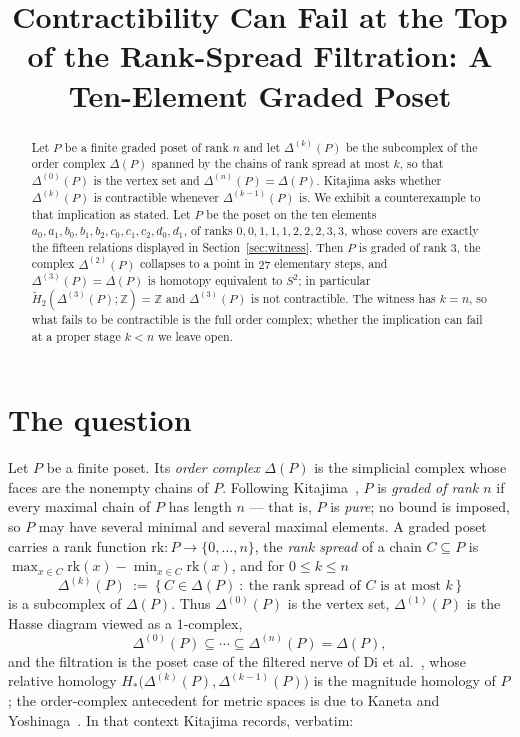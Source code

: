 \documentclass[11pt]{amsart}
\title[Contractibility can fail at the top filtration stage]
{Contractibility Can Fail at the Top of the Rank-Spread Filtration:
A Ten-Element Graded Poset}
\date{}
\newcommand{\rk}{\mathrm{rk}}
\newcommand{\Dl}{\Delta}
\newcommand{\ZZ}{\mathbb Z}
\newcommand{\Ho}{\widetilde H}
\begin{document}
\begin{abstract}
Let $P$ be a finite graded poset of rank $n$ and let $\Dl^{(k)}(P)$ be the
subcomplex of the order complex $\Dl(P)$ spanned by the chains of rank spread
at most $k$, so that $\Dl^{(0)}(P)$ is the vertex set and
$\Dl^{(n)}(P)=\Dl(P)$. Kitajima asks whether $\Dl^{(k)}(P)$ is contractible
whenever $\Dl^{(k-1)}(P)$ is. We exhibit a counterexample to that implication
as stated. Let $P$ be the poset on the ten elements
$a_0,a_1,b_0,b_1,b_2,c_0,c_1,c_2,d_0,d_1$, of ranks $0,0,1,1,1,2,2,2,3,3$,
whose covers are exactly the fifteen relations displayed in
Section~\ref{sec:witness}. Then $P$ is graded of rank $3$, the complex
$\Dl^{(2)}(P)$ collapses to a point in $27$ elementary steps, and
$\Dl^{(3)}(P)=\Dl(P)$ is homotopy equivalent to $S^2$; in particular
$\Ho_2(\Dl^{(3)}(P);\ZZ)=\ZZ$ and $\Dl^{(3)}(P)$ is not contractible. The
witness has $k=n$, so what fails to be contractible is the full order complex;
whether the implication can fail at a proper stage $k<n$ we leave open.
\end{abstract}

\maketitle

\section{The question}\label{sec:question}

Let $P$ be a finite poset. Its \emph{order complex} $\Dl(P)$ is the simplicial
complex whose faces are the nonempty chains of $P$. Following
Kitajima~\cite{Kitajima}, $P$ is \emph{graded of rank $n$} if every maximal
chain of $P$ has length $n$ --- that is, $P$ is \emph{pure}; no bound is
imposed, so $P$ may have several minimal and several maximal elements. A graded
poset carries a rank function $\rk\colon P\to\{0,\ldots,n\}$, the
\emph{rank spread} of a chain $C\subseteq P$ is
$\max_{x\in C}\rk(x)-\min_{x\in C}\rk(x)$, and for $0\le k\le n$
\[
  \Dl^{(k)}(P)\ :=\ \bigl\{\,C\in\Dl(P)\ :\ \text{the rank spread of $C$ is at
  most }k\,\bigr\}
\]
is a subcomplex of $\Dl(P)$. Thus $\Dl^{(0)}(P)$ is the vertex set,
$\Dl^{(1)}(P)$ is the Hasse diagram viewed as a $1$-complex,
\[
  \Dl^{(0)}(P)\subseteq\cdots\subseteq\Dl^{(n)}(P)=\Dl(P),
\]
and the filtration is the poset case of the filtered nerve of
Di et al.~\cite{DIMZ}, whose relative homology
$H_*\bigl(\Dl^{(k)}(P),\allowbreak\Dl^{(k-1)}(P)\bigr)$ is the magnitude
homology of $P$
\cite[Lemma~1.7]{DIMZ}; the order-complex antecedent for metric spaces is due
to Kaneta and Yoshinaga~\cite{KY}. In that context Kitajima records, verbatim:
\end{document}
